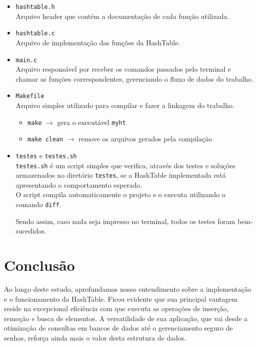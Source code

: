 \documentclass{article}
\begin{document}
    \begin{itemize}
        \item \texttt{hashtable.h} \\
        Arquivo header que contém a documentação de cada função utilizada.
        
        \item \texttt{hashtable.c} \\
        Arquivo de implementação das funções da HashTable.
        
        \item \texttt{main.c} \\
        Arquivo responsável por receber os comandos passados pelo terminal e chamar as funções correspondentes, gerenciando o fluxo de dados do trabalho.
        
        \item \texttt{Makefile} \\
        Arquivo simples utilizado para compilar e fazer a linkagem do trabalho.
        \begin{itemize}
            \item \texttt{make} \( \rightarrow \) gera o executável \texttt{myht}
            \item \texttt{make clean} \( \rightarrow \) remove os arquivos gerados pela compilação
        \end{itemize}
        
        \item \texttt{testes} e \texttt{testes.sh} \\
        \texttt{testes.sh} é um script simples que verifica, através dos testes e soluções armazenados no diretório \texttt{testes}, se a HashTable implementada está apresentando o comportamento esperado.\\
        O script compila automaticamente o projeto e o executa utilizando o comando \texttt{diff}.

        Sendo assim, caso nada seja impresso no terminal, todos os testes foram bem-sucedidos.
    \end{itemize}

    \section{Conclusão}\label{sec:conclusao}

    Ao longo deste estudo, aprofundamos nosso entendimento sobre a implementação e o funcionamento da HashTable.
    Ficou evidente que sua principal vantagem reside na excepcional eficiência com que executa as operações de inserção, remoção e busca de elementos.
    A versatilidade de sua aplicação, que vai desde a otimização de consultas em bancos de dados até o gerenciamento seguro de senhas, reforça ainda mais o valor desta estrutura de dados.
\end{document}

